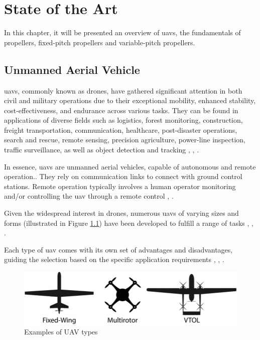 \chapter{State of the Art}
\label{chap:Chapter2}
In this chapter, it will be presented an overview of \glspl{uav}, the fundamentals of propellers, fixed-pitch propellers and variable-pitch propellers.

\section{Unmanned Aerial Vehicle}
\glspl{uav}, commonly known as drones, have gathered significant attention in both civil and military operations due to their exceptional mobility, enhanced stability, cost-effectiveness, and endurance across various tasks.
They can be found in applications of diverse fields such as logistics, forest monitoring, construction, freight transportation, communication, healthcare, post-disaster operations, search and rescue, remote sensing, precision agriculture, power-line inspection, traffic surveillance, as well as object detection and tracking \cite{UAV1}, \cite{UAV5}, \cite{UAV14}.

In essence, \glspl{uav} are unmanned aerial vehicles, capable of autonomous and remote operation..
They rely on communication links to connect with ground control stations.
Remote operation typically involves a human operator monitoring and/or controlling the \gls{uav} through a remote control \cite{UAV5}, \cite{UAV14}.

Given the widespread interest in drones, numerous \glspl{uav} of varying sizes and forms (illustrated in Figure \ref{fig:UAV_examples}) have been developed to fulfill a range of tasks \cite{UAV5}, \cite{UAV13}, \cite{UAV14}.

Each type of \gls{uav} comes with its own set of advantages and disadvantages, guiding the selection based on the specific application requirements \cite{UAV5}, \cite{UAV13}, \cite{UAV14}.

\begin{figure}[H]
    \centering
    \includegraphics[scale=0.45]{ch2/assets/UAV_examples.png}
    \caption{Examples of UAV types \cite{UAV13}}
    \label{fig:UAV_examples}
\end{figure}


